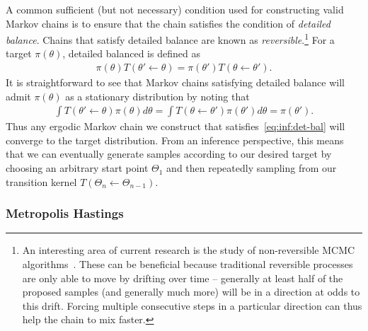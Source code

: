 A common sufficient (but not necessary) condition used for constructing valid Markov chains
is to ensure that the chain satisfies the condition of \emph{detailed balance}.  Chains that
satisfy detailed balance are known as 
\emph{reversible}.\footnote{An interesting area of current research is the study
	of non-reversible MCMC algorithms~\citep{bouchard2015bouncy,bierkens2016zig}.  These can
	be beneficial because traditional reversible processes are only able to move by drifting over time -- generally
	at least half of the proposed samples (and generally much more) will be in a direction at odds to
	this drift.  Forcing multiple consecutive steps in a particular direction can thus
	help  the chain to mix faster.}
For a target $\pi(\theta)$, detailed balanced is defined as
\begin{align}
\label{eq:inf:det-bal}
\pi(\theta) T(\theta' \leftarrow \theta) = \pi(\theta') T(\theta \leftarrow \theta').
\end{align}
It is straightforward to see that Markov chains satisfying detailed balance will admit $\pi(\theta)$
as a stationary distribution by noting that
\begin{align}
\int T(\theta' \leftarrow \theta) \pi(\theta)d\theta =  
\int T(\theta \leftarrow \theta') \pi(\theta')d\theta = \pi(\theta').
\end{align}
Thus any ergodic Markov chain we construct that satisfies~\eqref{eq:inf:det-bal}
will converge to the target distribution.  From an inference perspective, this means that
we can eventually generate samples according to our desired target by choosing an 
arbitrary start point $\Theta_1$ and then repeatedly sampling from our transition kernel $T(\Theta_n \leftarrow \Theta_{n-1})$.

\subsubsection{Metropolis Hastings}
\label{sec:inf:foundation:mcmc:mh}

